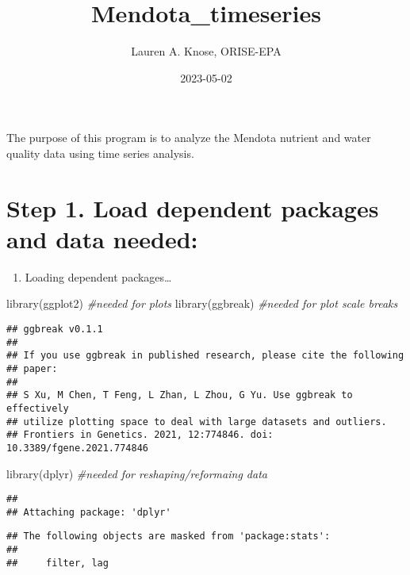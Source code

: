 \documentclass[
]{article}
\title{Mendota\_timeseries}
\author{Lauren A. Knose, ORISE-EPA}
\date{2023-05-02}
\newenvironment{Shaded}{\begin{snugshade}}{\end{snugshade}}
\newcommand{\CommentTok}[1]{\textcolor[rgb]{0.56,0.35,0.01}{\textit{#1}}}
\newcommand{\FunctionTok}[1]{\textcolor[rgb]{0.00,0.00,0.00}{#1}}
\newcommand{\NormalTok}[1]{#1}
\providecommand{\tightlist}{%
  \setlength{\itemsep}{0pt}\setlength{\parskip}{0pt}}
\begin{document}
\maketitle

The purpose of this program is to analyze the Mendota nutrient and water
quality data using time series analysis.

\hypertarget{step-1.-load-dependent-packages-and-data-needed}{%
\section{Step 1. Load dependent packages and data
needed:}\label{step-1.-load-dependent-packages-and-data-needed}}

\begin{enumerate}
\def\labelenumi{\alph{enumi})}
\tightlist
\item
  Loading dependent packages\ldots{}
\end{enumerate}

\begin{Shaded}
\begin{Highlighting}[]
\FunctionTok{library}\NormalTok{(ggplot2) }\CommentTok{\#needed for plots}
\FunctionTok{library}\NormalTok{(ggbreak) }\CommentTok{\#needed for plot scale breaks}
\end{Highlighting}
\end{Shaded}

\begin{verbatim}
## ggbreak v0.1.1
## 
## If you use ggbreak in published research, please cite the following
## paper:
## 
## S Xu, M Chen, T Feng, L Zhan, L Zhou, G Yu. Use ggbreak to effectively
## utilize plotting space to deal with large datasets and outliers.
## Frontiers in Genetics. 2021, 12:774846. doi: 10.3389/fgene.2021.774846
\end{verbatim}

\begin{Shaded}
\begin{Highlighting}[]
\FunctionTok{library}\NormalTok{(dplyr) }\CommentTok{\#needed for reshaping/reformaing data}
\end{Highlighting}
\end{Shaded}

\begin{verbatim}
## 
## Attaching package: 'dplyr'
\end{verbatim}

\begin{verbatim}
## The following objects are masked from 'package:stats':
## 
##     filter, lag
\end{verbatim}
\end{document}
